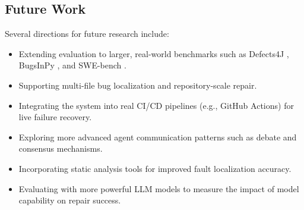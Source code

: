 \documentclass[conference]{IEEEtran}
\begin{document}
\subsection{Future Work}
Several directions for future research include:
\begin{itemize}
    \item Extending evaluation to larger, real-world benchmarks such as Defects4J \cite{defects4j}, BugsInPy \cite{bugsinpy}, and SWE-bench \cite{swebench}.
    \item Supporting multi-file bug localization and repository-scale repair.
    \item Integrating the system into real CI/CD pipelines (e.g., GitHub Actions) for live failure recovery.
    \item Exploring more advanced agent communication patterns such as debate and consensus mechanisms.
    \item Incorporating static analysis tools for improved fault localization accuracy.
    \item Evaluating with more powerful LLM models to measure the impact of model capability on repair success.
\end{itemize}



\end{document}
